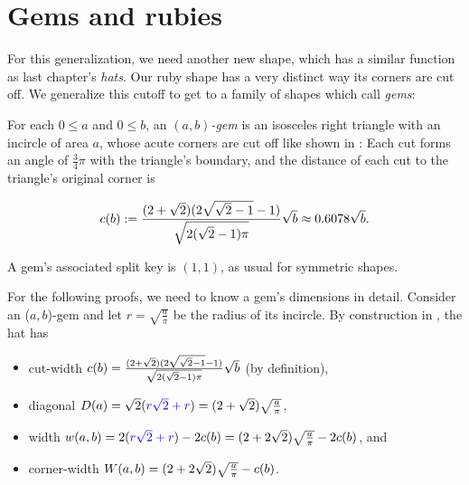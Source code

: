 \documentclass[a4paper,style=print,oneside,bibliography=totoc,nexus,lnum,extramargin]{tubsbook}
\begin{document}

\section{Gems and rubies}

For this generalization, we need another new shape, which has a similar function as last chapter's \emph{hats}. Our ruby shape has a very distinct way its corners are cut off. We generalize this cutoff to get to a family of shapes which call \emph{gems}:

\begin{definition}
    For each $0 \le a$ and $0 \le b$, an \emph{$(a,b)$-gem} is an isosceles right triangle with an incircle of area $a$, whose acute corners are cut off like shown in : Each cut forms an angle of $\frac3 4\pi$ with the triangle's boundary, and the distance of each cut to the triangle's original corner is

    $$c(b) := \frac{(2+\sqrt{2})(2\sqrt{\sqrt{2}-1}-1)}{\sqrt{2(\sqrt{2}-1)\pi}}\sqrt{b} \approx 0.6078 \sqrt{b}.$$

\end{definition}


\begin{definition}
    A gem's associated split key is $(1,1)$, as usual for symmetric shapes.
\end{definition}

For the following proofs, we need to know a gem's dimensions in detail.
Consider an ($a,b$)-gem and let $r = \sqrt{\frac{a}{\pi}}$ be the radius of its incircle. By construction in , the hat has
\begin{itemize}
    \item cut-width $c(b) = \frac{(2+\sqrt{2})(2\sqrt{\sqrt{2}-1}-1)}{\sqrt{2(\sqrt{2}-1)\pi}}\sqrt{b}$ (by definition),
    \item diagonal $D(a) = \sqrt{2}(\textcolor{blue}{r\sqrt{2}+r}) = (2+\sqrt{2})\sqrt{\frac{a}{\pi}}$,
    \item width $w(a,b) = 2(\textcolor{blue}{r\sqrt{2}+r}) - 2c(b) = (2+2\sqrt{2})\sqrt{\frac{a}{\pi}} - 2c(b)$, and
    \item corner-width $W(a,b) = (2+2\sqrt{2})\sqrt{\frac{a}{\pi}} - c(b)$.
\end{itemize}
\end{document}
